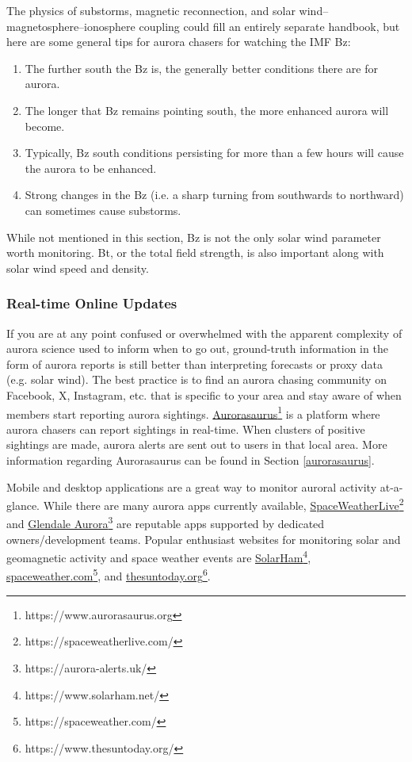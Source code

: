 \documentclass{article}
\renewcommand{\cite}[1]{\parencite{#1}}
\begin{document}
The physics of substorms, magnetic reconnection, and solar wind--magnetosphere--ionosphere coupling could fill an entirely separate handbook, but here are some general tips for aurora chasers for watching the IMF Bz:
\begin{enumerate}
    \item The further south the Bz is, the generally better conditions there are for aurora.
    \item The longer that Bz remains pointing south, the more enhanced aurora will become.
    \item Typically, Bz south conditions persisting for more than a few hours will cause the aurora to be enhanced.
    \item Strong changes in the Bz (i.e. a sharp turning from southwards to northward) can sometimes cause substorms.
\end{enumerate}

While not mentioned in this section, Bz is not the only solar wind parameter worth monitoring. Bt, or the total field strength, is also important along with solar wind speed and density.

\subsubsection{Real-time Online Updates}
If you are at any point confused or overwhelmed with the apparent complexity of aurora science used to inform when to go out, ground-truth information in the form of aurora reports is still better than interpreting forecasts or proxy data (e.g. solar wind). The best practice is to find an aurora chasing community on Facebook, X, Instagram, etc. that is specific to your area and stay aware of when members start reporting aurora sightings. \href{https://www.aurorasaurus.org}{Aurorasaurus}\footnote{https://www.aurorasaurus.org} \cite{MacDonald2015} is a platform where aurora chasers can report sightings in real-time. When clusters of positive sightings are made, aurora alerts are sent out to users in that local area. More information regarding Aurorasaurus can be found in Section \ref{aurorasaurus}.

Mobile and desktop applications are a great way to monitor auroral activity at-a-glance. While there are many aurora apps currently available, \href{https://spaceweatherlive.com/}{SpaceWeatherLive}\footnote{https://spaceweatherlive.com/} and \href{https://aurora-alerts.uk/}{Glendale Aurora}\footnote{https://aurora-alerts.uk/} are reputable apps supported by dedicated owners/development teams. Popular enthusiast websites for monitoring solar and geomagnetic activity and space weather events are \href{https://www.solarham.net/}{SolarHam}\footnote{https://www.solarham.net/}, \href{https://spaceweather.com/}{spaceweather.com}\footnote{https://spaceweather.com/}, and \href{https://www.thesuntoday.org/}{thesuntoday.org}\footnote{https://www.thesuntoday.org/}.
\end{document}
